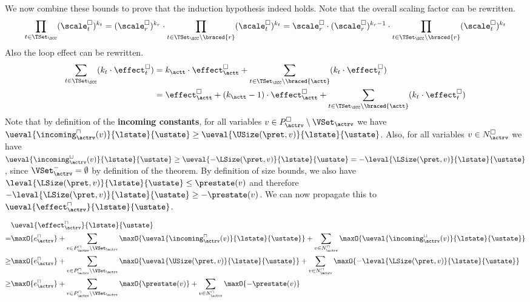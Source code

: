 We now combine these bounds to prove that the induction hypothesis indeed holds.
Note that the overall scaling factor can be rewritten.
\begin{equation} \label{eq:scaling_factor_reduction}
  \prod_{t \in \TSet_\SCC} (\scale^\square_t)^{k_t} = (\scale^\square_r)^{k_r} \cdot \prod_{t \in \TSet_\SCC \setminus \braced{r}} (\scale^\square_t)^{k_t} = \scale^\square_r \cdot (\scale^\square_r)^{k_r - 1} \cdot \prod_{t \in \TSet_\SCC \setminus \braced{r}} (\scale^\square_t)^{k_t}
\end{equation}
Also the loop effect can be rewritten.
\begin{equation} \label{eq:input_reduction}
  \begin{split}
  \sum_{t \in \TSet_\SCC} (k_t \cdot \effect^\square_t)
  & = k_\actt \cdot \effect^\square_\actt + \sum_{t \in \TSet_\SCC \setminus \braced{\actt}} (k_t \cdot \effect^\square_t) \\
  & = \effect^\square_\actt
    + (k_\actt - 1) \cdot \effect^\square_\actt
    + \sum_{t \in \TSet_\SCC \setminus \braced{\actt}} (k_t \cdot \effect^\square_t)
  \end{split}
\end{equation}
Note that by definition of the \textbf{incoming constants}, for all variables $v \in P^\square_\actrv \setminus \VSet_\actrv$ we have $\ueval{\incoming^\sqcap_\actrv(v)}{\lstate}{\ustate} \geq \ueval{\USize(\pret, v)}{\lstate}{\ustate}$.
Also, for all variables $v \in N^\square_\actrv$ we have $\ueval{\incoming^\sqcup_\actrv(v)}{\lstate}{\ustate} \geq \ueval{-\LSize(\pret, v)}{\lstate}{\ustate} = -\leval{\LSize(\pret, v)}{\lstate}{\ustate}$, since $\VSet^-_\actrv = \emptyset$ by definition of the theorem.
By definition of size bounds, we also have $\leval{\LSize(\pret, v)}{\lstate}{\ustate} \leq \prestate(v)$ and therefore $-\leval{\LSize(\pret, v)}{\lstate}{\ustate} \geq -\prestate(v)$.
We can now propagate this to $\ueval{\effect^\sqcap_\actrv}{\lstate}{\ustate}$.

\begin{equation} \label{eq:input_rv_reduction_upper}
  \begin{split}
  & \ueval{\effect^\sqcap_\actrv}{\lstate}{\ustate} \\
  = & \maxO{e^{\sqcap}_\actrv}
    + \sum_{v \in P_\actrv^\sqcap \setminus \VSet_\actrv} \maxO{\ueval{\incoming^\sqcap_\actrv(v)}{\lstate}{\ustate}}
    + \sum_{v \in N_\actrv^\sqcap} \maxO{\ueval{\incoming^\sqcup_\actrv(v)}{\lstate}{\ustate}} \\
  \geq & \maxO{e^{\sqcap}_\actrv}
    + \sum_{v \in P_\actrv^\sqcap \setminus \VSet_\actrv} \maxO{\ueval{\USize(\pret, v)}{\lstate}{\ustate}}
    + \sum_{v \in N_\actrv^\sqcap} \maxO{-\leval{\LSize(\pret, v)}{\lstate}{\ustate}} \\
  \geq & \maxO{e^{\sqcap}_\actrv}
    + \sum_{v \in P_\actrv^\sqcap \setminus \VSet_\actrv} \maxO{\prestate(v)}
    + \sum_{v \in N_\actrv^\sqcap} \maxO{-\prestate(v)} \\
  \end{split}
\end{equation}

